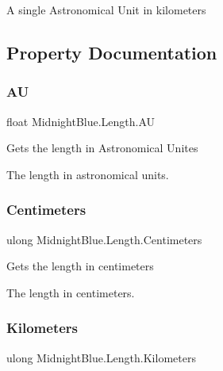 A single Astronomical Unit in kilometers 



\subsection{Property Documentation}
\hypertarget{class_midnight_blue_1_1_length_aa2325bd4894b015715784b027551826f}{}\label{class_midnight_blue_1_1_length_aa2325bd4894b015715784b027551826f} 
\subsubsection{\texorpdfstring{AU}{AU}}
{\footnotesize\ttfamily float Midnight\+Blue.\+Length.\+AU\hspace{0.3cm}{\ttfamily [get]}}



Gets the length in Astronomical Unites 

The length in astronomical units.\hypertarget{class_midnight_blue_1_1_length_a935aac3abfc2865e5960a40382227063}{}\label{class_midnight_blue_1_1_length_a935aac3abfc2865e5960a40382227063} 
\subsubsection{\texorpdfstring{Centimeters}{Centimeters}}
{\footnotesize\ttfamily ulong Midnight\+Blue.\+Length.\+Centimeters\hspace{0.3cm}{\ttfamily [get]}}



Gets the length in centimeters 

The length in centimeters.\hypertarget{class_midnight_blue_1_1_length_abf0d08eda94640cdb4706f96c3a97a29}{}\label{class_midnight_blue_1_1_length_abf0d08eda94640cdb4706f96c3a97a29} 
\subsubsection{\texorpdfstring{Kilometers}{Kilometers}}
{\footnotesize\ttfamily ulong Midnight\+Blue.\+Length.\+Kilometers\hspace{0.3cm}{\ttfamily [get]}}



